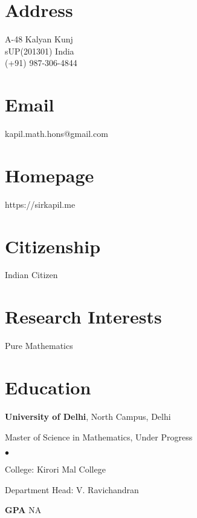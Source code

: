 \documentclass[margin,line]{res}
\newenvironment{list1}{
  \begin{list}{\ding{113}}{%
      \setlength{\itemsep}{0in}
      \setlength{\parsep}{0in} \setlength{\parskip}{0in}
      \setlength{\topsep}{0in} \setlength{\partopsep}{0in}
      \setlength{\leftmargin}{0.17in}}}{\end{list}}
\newenvironment{list2}{
  \begin{list}{$\bullet$}{%
      \setlength{\itemsep}{0in}
      \setlength{\parsep}{0in} \setlength{\parskip}{0in}
      \setlength{\topsep}{0in} \setlength{\partopsep}{0in}
      \setlength{\leftmargin}{0.2in}}}{\end{list}}
\begin{document}

\begin{resume}
\section{\sc Address}
\onehalfspacing
A-48 Kalyan Kunj \\
sUP(201301) India\\
(+91) 987-306-4844

\section{\sc Email}
kapil.math.hons@gmail.com

\section{\sc Homepage}
https://sirkapil.me

\section{\sc Citizenship}
Indian Citizen

\section{\sc Research Interests}
Pure Mathematics
\vspace{0.1in}
\section{\sc Education}
{\bf University of Delhi}, North Campus, Delhi\\
\vspace*{-.1in}
\begin{list1}
\item[] Master of Science in Mathematics, Under Progress
\begin{list2}
\vspace*{.05in}
\item College:  Kirori Mal College
\item Department Head:  V. Ravichandran
\item[] {\bf \footnotesize GPA} NA
\end{list2}
\vspace*{.05in}
\end{list1}


\end{resume}
\end{document}
